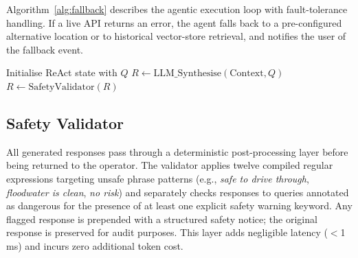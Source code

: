 \documentclass[conference]{IEEEtran}
\begin{document}
Algorithm~\ref{alg:fallback} describes the agentic execution loop with
fault-tolerance handling. If a live API returns an error, the agent falls back
to a pre-configured alternative location or to historical vector-store
retrieval, and notifies the user of the fallback event.

\begin{algorithm}[ht]
\caption{Agentic API Execution with Fault Tolerance}
\label{alg:fallback}
\SetAlgoLined
{}
Initialise ReAct state with $Q$\;
$R \leftarrow \text{LLM\_Synthesise}(\text{Context}, Q)$\;
$R \leftarrow \text{SafetyValidator}(R)$\;
\;
\end{algorithm}

\subsection{Safety Validator}

All generated responses pass through a deterministic post-processing layer
before being returned to the operator. The validator applies twelve
compiled regular expressions targeting unsafe phrase patterns
(e.g., \textit{safe to drive through}, \textit{floodwater is clean},
\textit{no risk}) and separately checks responses to queries annotated as
dangerous for the presence of at least one explicit safety warning keyword.
Any flagged response is prepended with a structured safety notice; the
original response is preserved for audit purposes. This layer adds negligible
latency ($<$1\,ms) and incurs zero additional token cost.
\end{document}
